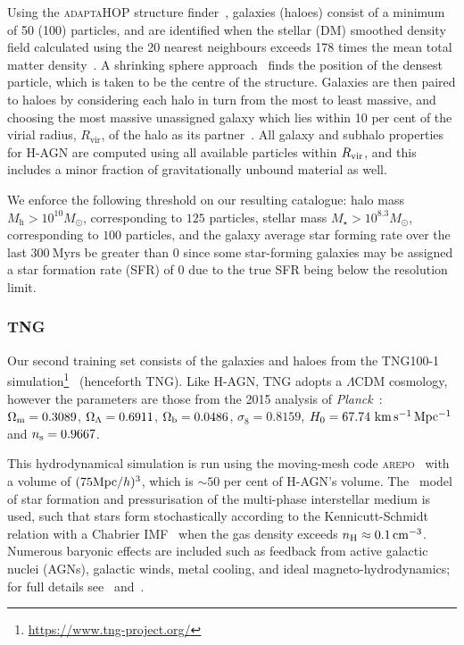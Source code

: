\documentclass[useAMS,usenatbib]{mnras}
\begin{document}
Using the \textsc{adaptaHOP} structure finder~\citep{Aubert_2004,Tweed_2009}, galaxies (haloes) consist of a minimum of 50 (100) particles, and are identified when the stellar (\ac{DM}) smoothed density field calculated using the 20 nearest neighbours exceeds 178 times the mean total matter density~\citep{Gunn_1972}. A shrinking sphere approach~\citep{Power_2003} finds the position of the densest particle, which is taken to be the centre of the structure. Galaxies are then paired to haloes by considering each halo in turn from the most to least massive, and choosing the most massive unassigned galaxy which lies within 10 per cent of the virial radius, $R_\mathrm{vir}$, of the halo as its partner~\citep{Chisari_2017,Bartlett_OffsetBH_2021}. All galaxy and subhalo properties for H-AGN are computed using all available particles within $R_{\rm vir}$, and this includes a minor fraction of gravitationally unbound material as well.

We enforce the following threshold on our resulting catalogue: halo mass $M_\mathrm{h} > 10^{10} M_\odot$, corresponding to $125$ particles, stellar mass $M_\star > 10^{8.3} M_\odot$, corresponding to $100$ particles, and the galaxy average star forming rate over the last $300~\mathrm{Myrs}$ be greater than $0$ since some star-forming galaxies may be assigned a star formation rate (SFR) of $0$ due to the true SFR being below the resolution limit.

\subsubsection{TNG}\label{sec:TNG-100}

Our second training set consists of the galaxies and haloes from the TNG100-1 simulation\footnote{\url{https://www.tng-project.org/}}~\citep{Marinacci_2018,Naiman_2018,Nelson_2018,Pillepich_2018_results,Springel_2018} (henceforth TNG). Like H-AGN, TNG adopts a $\Lambda$CDM cosmology, however the parameters are those from the 2015 analysis of \textit{Planck}~\citep{Planck_Parameters_2016}: $\Omega_{\rm m} = 0.3089$, $\Omega_{\rm \Lambda}=0.6911$, $\Omega_{\rm b}=0.0486$, $\sigma_8=0.8159$, $H_0 = 67.74 \, {\rm \, km \, s^{-1} \, Mpc^{-1}}$ and $n_{\rm s} = 0.9667$.

This hydrodynamical simulation is run using the moving-mesh code \textsc{arepo}~\citep{Springel_2010} with a volume of $(75 {\rm Mpc}/h)^3$, which is $\sim50$ per cent of H-AGN's volume. The~\citet{Springel_2003} model of star formation and pressurisation of the multi-phase interstellar medium is used, such that stars form stochastically according to the Kennicutt-Schmidt relation with a Chabrier IMF~\citep{Chabrier_2003} when the gas density exceeds $n_{\rm H} \approx 0.1 {\rm \, cm^{-3}}$. Numerous baryonic effects are included such as feedback from active galactic nuclei (AGNs), galactic winds, metal cooling, and ideal magneto-hydrodynamics; for full details see~\citet{Weinberger_2017} and~\citet{Pillepich_2018_methods}.
\end{document}
